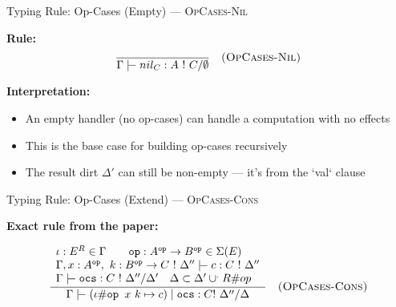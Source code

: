 \begin{frame}{Typing Rule: Op-Cases (Empty) — \textsc{OpCases-Nil}}

\textbf{Rule:}
\[
\frac{}{\Gamma \tvdash nil_{C} : A\ !\ C / \emptyset  }
\quad\textsc{(OpCases-Nil)}
\]

\vspace{1em}

\textbf{Interpretation:}
\begin{itemize}
  \item An empty handler (no op-cases) can handle a computation with no effects
  \item This is the base case for building op-cases recursively
  \item The result dirt \( \Delta' \) can still be non-empty — it's from the `val` clause
\end{itemize}

\end{frame}

\begin{frame}{Typing Rule: Op-Cases (Extend) — \textsc{OpCases-Cons}}

\textbf{Exact rule from the paper:}

\[
\frac{
  \begin{array}{l}
    \iota : E^R \in \Gamma \quad\quad \texttt{op} : A^{\texttt{op}} \rightarrow B^{\texttt{op}} \in \Sigma(E) \\
    \Gamma, x : A^{\texttt{op}},\ k : B^{\texttt{op}} \rightarrow C\ !\ \Delta''
    \tvdash c : C\ !\ \Delta'' \\
    \Gamma \tvdash \texttt{ocs} : C\ !\ \Delta''  / \Delta' 
    \quad
    \Delta \subset \Delta' \cup^. R \#op
  \end{array}
}{
  \Gamma \tvdash (\iota \# \texttt{op } x\ k \mapsto c) \mid \texttt{ocs}
  : C !\ \Delta'' / \Delta 
}
\quad\textsc{(OpCases-Cons)}
\]

\end{frame}